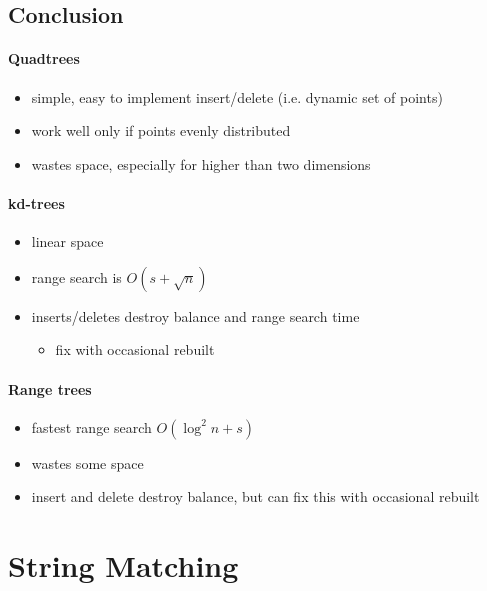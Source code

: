\documentclass{article}
\begin{document}
\subsection{Conclusion}

\paragraph{Quadtrees}
\begin{itemize}
    \item simple, easy to implement insert/delete (i.e. dynamic set of points)
    \item work well only if points evenly distributed
    \item wastes space, especially for higher than two dimensions
\end{itemize}

\paragraph{kd-trees}
\begin{itemize}
    \item linear space
    \item range search is $O(s + \sqrt{n})$
    \item inserts/deletes destroy balance and range search time
    \begin{itemize}
        \item fix with occasional rebuilt
    \end{itemize}
\end{itemize}

\paragraph{Range trees}
\begin{itemize}
    \item fastest range search $O(\log^2 n + s)$
    \item wastes some space
    \item insert and delete destroy balance, but can fix this with occasional rebuilt
\end{itemize}



\newpage

\section{String Matching} 
\end{document}
